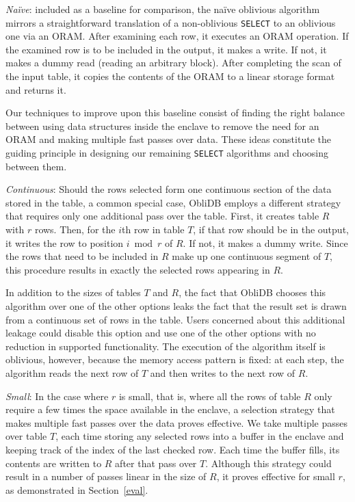 \documentclass[letterpaper,twocolumn,10pt]{article}
\def\name/{ObliDB}
\begin{document}
\textit{Na\"ive}: included as a baseline for comparison, the na\"ive oblivious algorithm mirrors a straightforward translation of a non-oblivious \texttt{SELECT} to an oblivious one via an ORAM. After examining each row, it executes an ORAM operation. If the examined row is to be included in the output, it makes a write. If not, it makes a dummy read (reading an arbitrary block). After completing the scan of the input table, it copies the contents of the ORAM to a linear storage format and returns it.

Our techniques to improve upon this baseline consist of finding the right balance between using data structures inside the enclave to remove the need for an ORAM and making multiple fast passes over data. These ideas constitute the guiding principle in designing our remaining \texttt{SELECT} algorithms and choosing between them.

\textit{Continuous}: Should the rows selected form one continuous section of the data stored in the table, a common special case, \name/ employs a different strategy that requires only one additional pass over the table. First, it creates table $R$ with $r$ rows. Then, for the $i$th row in table $T$, if that row should be in the output, it writes the row to position $i\bmod r$ of $R$. If not, it makes a dummy write. Since the rows that need to be included in $R$ make up one continuous segment of $T$, this procedure results in exactly the selected rows appearing in $R$.

In addition to the sizes of tables $T$ and $R$, the fact that \name/ chooses this algorithm over one of the other options leaks the fact that the result set is drawn from a continuous set of rows in the table. Users concerned about this additional leakage could disable this option and use one of the other options with no reduction in supported functionality. The execution of the algorithm itself is oblivious, however, because the memory access pattern is fixed: at each step, the algorithm reads the next row of $T$ and then writes to the next row of $R$.

\textit{Small}: In the case where $r$ is small, that is, where all the rows of table $R$ only require a few times the space available in the enclave, a selection strategy that makes multiple fast passes over the data proves effective. We take multiple passes over table $T$, each time storing any selected rows into a buffer in the enclave and keeping track of the index of the last checked row. Each time the buffer fills, its contents  are written to $R$ after that pass over $T$. Although this strategy could result in a number of passes linear in the size of $R$, it proves effective for small $r$, as demonstrated in Section~\ref{eval}.
\end{document}
